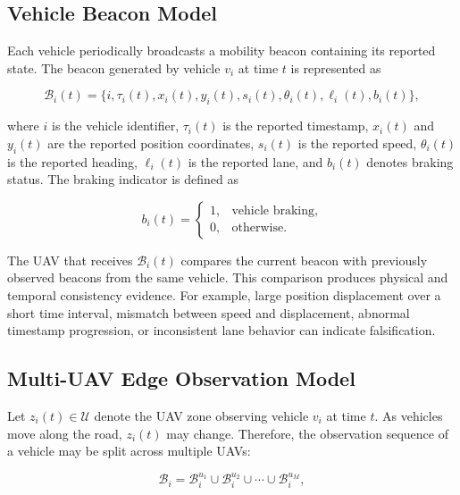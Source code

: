 \documentclass[journal]{IEEEtran}
\begin{document}
\subsection{Vehicle Beacon Model}
\label{subsec:beacon_model}

Each vehicle periodically broadcasts a mobility beacon containing its reported state. The beacon generated by vehicle \(v_i\) at time \(t\) is represented as

\begin{equation}
\mathcal{B}_i(t)=\{i, \tau_i(t), x_i(t), y_i(t), s_i(t), \theta_i(t), \ell_i(t), b_i(t)\},
\label{eq:beacon_model}
\end{equation}

where \(i\) is the vehicle identifier, \(\tau_i(t)\) is the reported timestamp, \(x_i(t)\) and \(y_i(t)\) are the reported position coordinates, \(s_i(t)\) is the reported speed, \(\theta_i(t)\) is the reported heading, \(\ell_i(t)\) is the reported lane, and \(b_i(t)\) denotes braking status. The braking indicator is defined as

\begin{equation}
b_i(t)=
\begin{cases}
1, & \text{vehicle braking},\\
0, & \text{otherwise}.
\end{cases}
\label{eq:braking_status}
\end{equation}

The UAV that receives \(\mathcal{B}_i(t)\) compares the current beacon with previously observed beacons from the same vehicle. This comparison produces physical and temporal consistency evidence. For example, large position displacement over a short time interval, mismatch between speed and displacement, abnormal timestamp progression, or inconsistent lane behavior can indicate falsification.

\subsection{Multi-UAV Edge Observation Model}
\label{subsec:multi_uav_observation}

Let \(z_i(t)\in\mathcal{U}\) denote the UAV zone observing vehicle \(v_i\) at time \(t\). As vehicles move along the road, \(z_i(t)\) may change. Therefore, the observation sequence of a vehicle may be split across multiple UAVs:

\begin{equation}
\mathcal{B}_i = \mathcal{B}_i^{u_1} \cup \mathcal{B}_i^{u_2} \cup \cdots \cup \mathcal{B}_i^{u_M},
\label{eq:fragmented_observation}
\end{equation}
\end{document}
